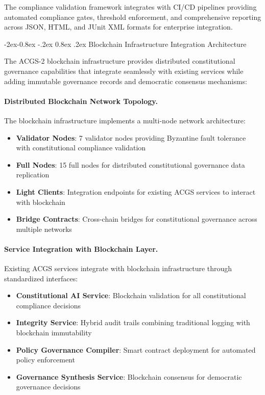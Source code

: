 \documentclass[manuscript,screen,9pt]{acmart}
\makeatletter
\renewcommand\subsubsection{\@startsection{subsubsection}{3}{\z@}%
  {-2ex\@plus -0.8ex \@minus -.2ex}%
  {0.8ex \@plus .2ex}%
  {\normalfont\normalsize\bfseries}}
\makeatother
\begin{document}
The compliance validation framework integrates with CI/CD pipelines providing automated compliance gates, threshold enforcement, and comprehensive reporting across JSON, HTML, and JUnit XML formats for enterprise integration.

\subsubsection{Blockchain Infrastructure Integration Architecture}
\label{subsubsec:blockchain_infrastructure_integration}

The ACGS-2 blockchain infrastructure provides distributed constitutional governance capabilities that integrate seamlessly with existing services while adding immutable governance records and democratic consensus mechanisms:

\paragraph{Distributed Blockchain Network Topology.} The blockchain infrastructure implements a multi-node network architecture:
\begin{itemize}[itemsep=1pt,parsep=1pt]
    \item \textbf{Validator Nodes}: 7 validator nodes providing Byzantine fault tolerance with constitutional compliance validation
    \item \textbf{Full Nodes}: 15 full nodes for distributed constitutional governance data replication
    \item \textbf{Light Clients}: Integration endpoints for existing ACGS services to interact with blockchain
    \item \textbf{Bridge Contracts}: Cross-chain bridges for constitutional governance across multiple networks
\end{itemize}

\paragraph{Service Integration with Blockchain Layer.} Existing ACGS services integrate with blockchain infrastructure through standardized interfaces:
\begin{itemize}[itemsep=1pt,parsep=1pt]
    \item \textbf{Constitutional AI Service}: Blockchain validation for all constitutional compliance decisions
    \item \textbf{Integrity Service}: Hybrid audit trails combining traditional logging with blockchain immutability
    \item \textbf{Policy Governance Compiler}: Smart contract deployment for automated policy enforcement
    \item \textbf{Governance Synthesis Service}: Blockchain consensus for democratic governance decisions
\end{itemize}
\end{document}
